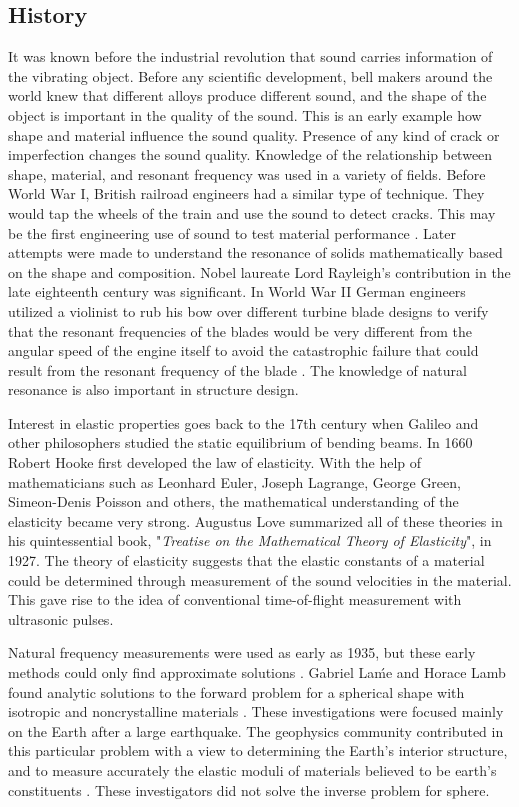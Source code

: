 \begin{doublespacing}
\subsection{History}
It was known before the industrial revolution that sound carries information of the vibrating object. Before any scientific development, bell makers around the world knew that different alloys produce different sound, and the shape of the object is important in the quality of the sound. This is an early example how shape and material influence the sound quality. Presence of any kind of crack or imperfection changes the sound quality. Knowledge of the relationship between shape, material, and resonant frequency was used in a variety of fields. Before World War I, British railroad engineers had a similar type of technique. They would tap the wheels of the train and use the sound to detect cracks. This may be the first engineering use of sound to test material performance \cite{migliori1996resonant}. Later attempts were made to understand the resonance of solids mathematically based on the shape and composition. Nobel laureate Lord Rayleigh's contribution in the late eighteenth century was significant. In World War II German engineers utilized a violinist to rub his bow over different turbine blade designs to verify that the resonant frequencies of the blades would be very different from the angular speed of the engine itself to avoid the catastrophic failure that could result from the resonant frequency of the blade \cite{hallion1983designers}. The knowledge of natural resonance is also important in structure design.

Interest in elastic properties goes back to the 17th century when Galileo and other philosophers studied the static equilibrium of bending beams. In 1660 Robert Hooke first developed the law of elasticity. With the help of mathematicians such as Leonhard Euler, Joseph Lagrange, George Green, Simeon-Denis Poisson and others, the mathematical understanding of the elasticity became very strong. Augustus Love summarized all of these theories in his quintessential book, "\emph{Treatise on the Mathematical Theory of Elasticity}", in 1927. The theory of elasticity suggests that the elastic constants of a material could be determined through measurement of the sound velocities in the material. This gave rise to the idea of conventional time-of-flight measurement with ultrasonic pulses.

Natural frequency measurements were used as early as 1935, but these early methods could only find approximate solutions \cite{demarest1971cube}. Gabriel La{\'m}e and Horace Lamb found analytic solutions to the forward problem for a spherical shape with isotropic and noncrystalline materials \cite{love2013treatise}. These investigations were focused mainly on the Earth after a large earthquake. The geophysics community contributed in this particular problem with a view to determining the Earth's interior structure, and to measure accurately the elastic moduli of materials believed to be earth's constituents \cite{maynard2008resonant}. These investigators did not solve the inverse problem for sphere. 


\end{doublespacing}
